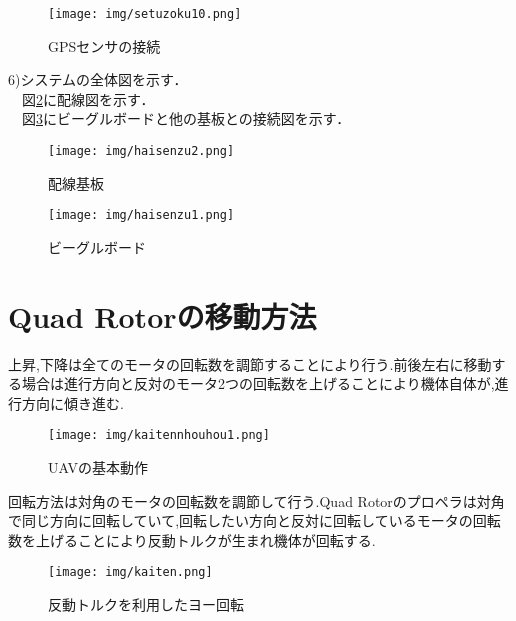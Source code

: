 \documentclass[12pt,oneside]{sotsuken_paper}
\begin{document}
\begin{figure}[H]
\begin{center}
\texttt{[image: img/setuzoku10.png]}
\end{center}
\caption{GPSセンサの接続}
\label{fig:setuzoku10}
\end{figure}

6)システムの全体図を示す．\\
　図\ref{fig:haisenzu2}に配線図を示す．\\
　図\ref{fig:haisenzu1}にビーグルボードと他の基板との接続図を示す．\\

\begin{figure}[H]
\begin{center}
\texttt{[image: img/haisenzu2.png]}
\end{center}
\caption{配線基板}
\label{fig:haisenzu2}
\end{figure}

\begin{figure}[H]
\begin{center}
\texttt{[image: img/haisenzu1.png]}
\end{center}
\caption{ビーグルボード}
\label{fig:haisenzu1}
\end{figure}


\section{Quad Rotorの移動方法}
上昇,下降は全てのモータの回転数を調節することにより行う.前後左右に移動する場合は進行方向と反対のモータ2つの回転数を上げることにより機体自体が,進行方向に傾き進む.

\begin{figure}[H]
\begin{center}
\texttt{[image: img/kaitennhouhou1.png]}
\end{center}
\caption{UAVの基本動作}
\label{fig:kaitennhouhou1}
\end{figure}

回転方法は対角のモータの回転数を調節して行う.Quad Rotorのプロペラは対角で同じ方向に回転していて,回転したい方向と反対に回転しているモータの回転数を上げることにより反動トルクが生まれ機体が回転する.

\begin{figure}[H]
\begin{center}
\texttt{[image: img/kaiten.png]}
\end{center}
\caption{反動トルクを利用したヨー回転}
\label{fig:kaiten}
\end{figure}
\end{document}
